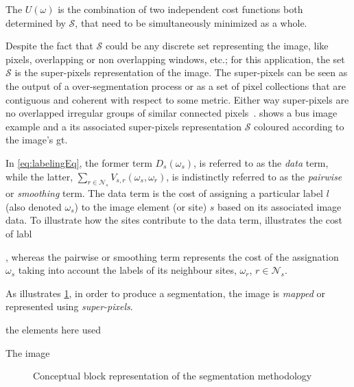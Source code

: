 The $U(\omega)$ is the combination of two independent cost functions both determined by $\mathcal{S}$, that need to be simultaneously minimized as a whole.

Despite the fact that $\mathcal{S}$ could be any discrete set representing the image, like pixels, overlapping or non overlapping windows, etc.; 
for this application, the set $\mathcal{S}$ is the super-pixels representation of the image. 
The super-pixels can be seen as the output of a over-segmentation process or as a set of pixel collections that are contiguous and coherent with respect to some metric. Either way super-pixels are no overlapped irregular groups of similar connected pixels~\cite{achanta2012slic}.
 shows a \ac{bus} image example and a its associated super-pixels representation $\mathcal{S}$ coloured according to the image's \ac{gt}.

In \cref{eq:labelingEq}, the former term $D_s(\omega_s)$, is referred to as the \emph{data} term, while the latter, $\sum_{r \in \mathcal{N}_{s}} V_{s,r}(\omega_s,\omega_r)$, is indistinctly referred to as the \emph{pairwise} or \emph{smoothing} term.
 The data term is the cost of assigning a particular label $l$ (also denoted $\omega_s$) to the image element (or site) $s$ based on its associated image data.
To illustrate how the sites contribute to the data term, 
 illustrates the cost of labl 

 
 , whereas the pairwise or smoothing term represents the cost of the assignation $\omega_s$ taking into account the labels of its neighbour sites, $\omega_r$, $r \in \mathcal{N}_{s}$. 

As illustrates \cref{fig:method}, in order to produce a segmentation, the image is \emph{mapped} or represented using \emph{super-pixels}. 

the elements here used 

 The image 
%
%
%
%
\begin{figure}[htpb]
  \centering
  \caption{Conceptual block representation of the segmentation methodology}
  \label{fig:method}
\end{figure}

